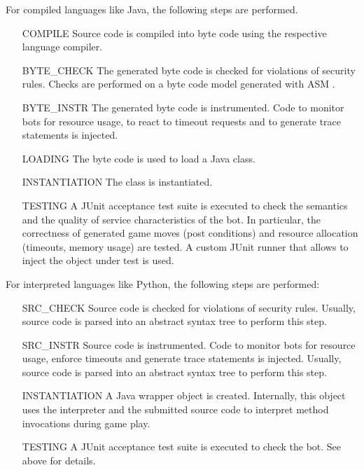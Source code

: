 For compiled languages like Java, the following steps are performed.



\begin{itemize}

\item[COMPILE] Source code is compiled into byte code using the respective language compiler.

\item[BYTE\_CHECK] The generated byte code is checked for violations of security rules. Checks are performed on a byte code model generated with ASM \cite{bruneton2002asm}.

\item[BYTE\_INSTR] The generated byte code is instrumented. Code to monitor bots for resource usage, to react to timeout requests and to generate trace statements is injected.

\item[LOADING] The byte code is used to load a Java class. 

\item[INSTANTIATION] The class is instantiated.

\item[TESTING] A JUnit \cite{beck1998test} acceptance test suite is executed to check the semantics and the quality of service characteristics of the bot. In particular, the correctness of generated game moves (post conditions) and resource allocation (timeouts, memory usage) are tested. A custom JUnit runner that allows to inject the object under test is used. 

\end{itemize}


For interpreted languages like Python, the following steps are performed:

\begin{itemize}

\item[SRC\_CHECK] Source code is checked for violations of security rules. Usually, source code is parsed into an abstract syntax tree to perform this step.

\item[SRC\_INSTR] Source code is instrumented. Code to monitor bots for resource usage, enforce timeouts and generate trace statements is injected. Usually, source code is parsed into an abstract syntax tree to perform this step.

\item[INSTANTIATION] A Java wrapper object is created. Internally, this object uses the interpreter and the submitted source code to interpret method invocations during game play.

\item[TESTING] A JUnit acceptance test suite is executed to check
the bot. See above for details.

\end{itemize}


